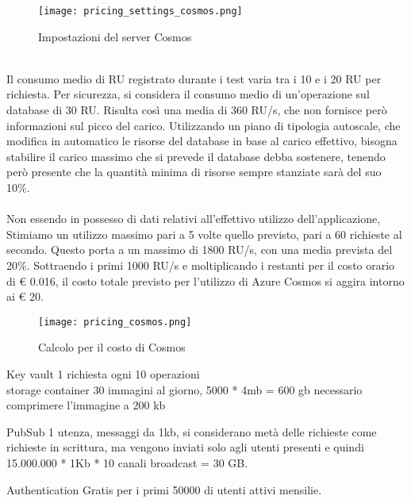 \begin{figure}[htbp]
    \begin{center}
        \texttt{[image: pricing\_settings\_cosmos.png]}
        \caption{Impostazioni del server Cosmos}
    \end{center}
\end{figure}
\\
Il consumo medio di RU registrato durante i test 
varia tra i 10 e i 20 RU per richiesta.
Per sicurezza, si considera il consumo medio di un'operazione sul database
di 30 RU.
Risulta così una media di 360 RU/s,
che non fornisce però informazioni sul picco del carico. 
Utilizzando un piano di tipologia autoscale,
che modifica in automatico le risorse del database in base al carico effettivo,
bisogna stabilire il carico massimo che si prevede il database debba sostenere,
tenendo però presente che la quantità minima di risorse sempre stanziate sarà del suo 10\%.\\
\\
Non essendo in possesso di dati relativi all'effettivo utilizzo dell'applicazione,
Stimiamo un utilizzo massimo pari a 5 volte quello previsto, 
pari a 60 richieste al secondo.
Questo porta a un massimo di 1800 RU/s, con una media prevista del 20\%.
Sottraendo i primi 1000 RU/s e moltiplicando i restanti per il costo orario di € 0.016, 
il costo totale previsto per l'utilizzo di Azure Cosmos si aggira intorno ai € 20.\\
\begin{figure}[htbp]
    \begin{center}
        \texttt{[image: pricing\_cosmos.png]}
        \caption{Calcolo per il costo di Cosmos}
    \end{center}
\end{figure}
\clearpage






Key vault
1 richiesta ogni 10 operazioni
\\



storage container
30 immagini al giorno, 5000 * 4mb = 600 gb
necessario comprimere l'immagine a 200 kb

PubSub
 1 utenza, 
 messaggi da 1kb, si considerano metà delle richieste come richieste in scrittura, 
 ma vengono inviati solo agli utenti presenti
 e quindi 15.000.000 * 1Kb * 10 canali broadcast = 30 GB.

Authentication
Gratis per i primi 50000 di utenti attivi mensilie.

